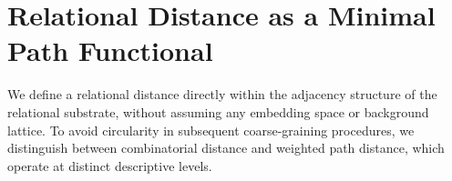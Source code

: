 \section{Relational Distance as a Minimal Path Functional}
  \label{app:relational-distance-minimal-path}

  We define a relational distance directly within the adjacency
  structure of the relational substrate, without assuming any embedding
  space or background lattice.
  To avoid circularity in subsequent coarse-graining procedures,
  we distinguish between combinatorial distance and weighted
  path distance, which operate at distinct descriptive levels.

  
  
  
